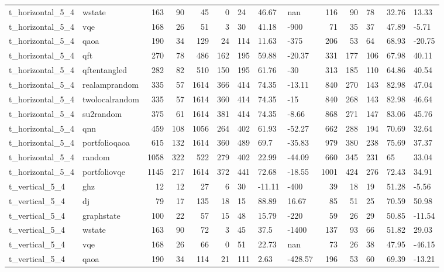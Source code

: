 \begin{longtable}{llrrrrlllrrlll}
t\_horizontal\_5\_4 & wstate & 163 & 90 & 45 & 0 & 24 & 46.67 & nan & 116 & 90 & 78 & 32.76 & 13.33 \\
t\_horizontal\_5\_4 & vqe & 168 & 26 & 51 & 3 & 30 & 41.18 & -900 & 71 & 35 & 37 & 47.89 & -5.71 \\
t\_horizontal\_5\_4 & qaoa & 190 & 34 & 129 & 24 & 114 & 11.63 & -375 & 206 & 53 & 64 & 68.93 & -20.75 \\
t\_horizontal\_5\_4 & qft & 270 & 78 & 486 & 162 & 195 & 59.88 & -20.37 & 331 & 177 & 106 & 67.98 & 40.11 \\
t\_horizontal\_5\_4 & qftentangled & 282 & 82 & 510 & 150 & 195 & 61.76 & -30 & 313 & 185 & 110 & 64.86 & 40.54 \\
t\_horizontal\_5\_4 & realamprandom & 335 & 57 & 1614 & 366 & 414 & 74.35 & -13.11 & 840 & 270 & 143 & 82.98 & 47.04 \\
t\_horizontal\_5\_4 & twolocalrandom & 335 & 57 & 1614 & 360 & 414 & 74.35 & -15 & 840 & 268 & 143 & 82.98 & 46.64 \\
t\_horizontal\_5\_4 & su2random & 375 & 61 & 1614 & 381 & 414 & 74.35 & -8.66 & 868 & 271 & 147 & 83.06 & 45.76 \\
t\_horizontal\_5\_4 & qnn & 459 & 108 & 1056 & 264 & 402 & 61.93 & -52.27 & 662 & 288 & 194 & 70.69 & 32.64 \\
t\_horizontal\_5\_4 & portfolioqaoa & 615 & 132 & 1614 & 360 & 489 & 69.7 & -35.83 & 979 & 380 & 238 & 75.69 & 37.37 \\
t\_horizontal\_5\_4 & random & 1058 & 322 & 522 & 279 & 402 & 22.99 & -44.09 & 660 & 345 & 231 & 65 & 33.04 \\
t\_horizontal\_5\_4 & portfoliovqe & 1145 & 217 & 1614 & 372 & 441 & 72.68 & -18.55 & 1001 & 424 & 276 & 72.43 & 34.91 \\
t\_vertical\_5\_4 & ghz & 12 & 12 & 27 & 6 & 30 & -11.11 & -400 & 39 & 18 & 19 & 51.28 & -5.56 \\
t\_vertical\_5\_4 & dj & 79 & 17 & 135 & 18 & 15 & 88.89 & 16.67 & 85 & 51 & 25 & 70.59 & 50.98 \\
t\_vertical\_5\_4 & graphstate & 100 & 22 & 57 & 15 & 48 & 15.79 & -220 & 59 & 26 & 29 & 50.85 & -11.54 \\
t\_vertical\_5\_4 & wstate & 163 & 90 & 72 & 3 & 45 & 37.5 & -1400 & 137 & 93 & 66 & 51.82 & 29.03 \\
t\_vertical\_5\_4 & vqe & 168 & 26 & 66 & 0 & 51 & 22.73 & nan & 73 & 26 & 38 & 47.95 & -46.15 \\
t\_vertical\_5\_4 & qaoa & 190 & 34 & 114 & 21 & 111 & 2.63 & -428.57 & 196 & 53 & 60 & 69.39 & -13.21 \\

\end{longtable}
